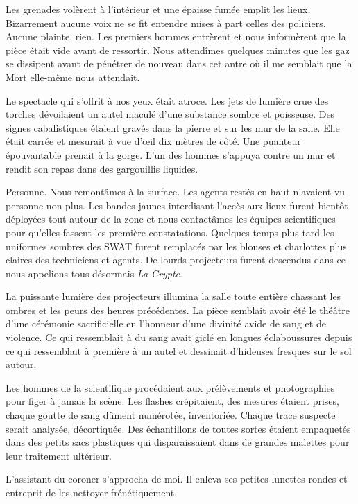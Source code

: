 Les grenades volèrent à l'intérieur et une épaisse fumée emplit les lieux. Bizarrement aucune voix ne se fit entendre 
mises à part celles des policiers. Aucune plainte, rien. Les premiers hommes entrèrent et nous informèrent que la pièce 
était vide avant de ressortir. Nous attendîmes quelques minutes que les gaz se dissipent avant de pénétrer de nouveau 
dans cet antre où il me semblait que la Mort elle-même nous attendait.

Le spectacle qui s'offrit à nos yeux était atroce. Les jets de lumière crue des torches dévoilaient un autel maculé 
d'une substance sombre et poisseuse. Des signes cabalistiques étaient gravés dans la pierre et sur les mur de la salle. 
Elle était carrée et mesurait à vue d'œil dix mètres de côté. Une puanteur épouvantable prenait à la gorge. L'un des 
hommes s'appuya contre un mur et rendit son repas dans des gargouillis liquides.

Personne. Nous remontâmes à la surface. Les agents restés en haut n'avaient vu personne non plus. Les bandes jaunes 
interdisant l'accès aux lieux furent bientôt déployées tout autour de la zone et nous contactâmes les équipes 
scientifiques pour qu'elles fassent les première constatations. Quelques temps plus tard les uniformes sombres des SWAT 
furent remplacés par les blouses et charlottes plus claires des techniciens et agents. De lourds projecteurs 
furent descendus dans ce nous appelions tous désormais \emph{La Crypte}.

La puissante lumière des projecteurs illumina la salle toute entière chassant les ombres et les peurs des heures 
précédentes. La pièce semblait avoir été le théâtre d'une cérémonie sacrificielle en l'honneur d'une divinité avide de 
sang et de violence. Ce qui ressemblait à du sang avait giclé en longues éclaboussures depuis ce qui ressemblait à 
première à un autel et dessinait d'hideuses fresques sur le sol autour.

Les hommes de la scientifique procédaient aux prélèvements et photographies pour figer à jamais la scène. Les flashes 
crépitaient, des mesures étaient prises, chaque goutte de sang dûment numérotée, inventoriée. Chaque trace suspecte serait 
analysée, décortiquée. Des échantillons de toutes sortes étaient empaquetés dans des petits sacs plastiques qui 
disparaissaient dans de grandes malettes pour leur traitement ultérieur.

L'assistant du coroner s'approcha de moi. Il enleva ses petites lunettes rondes et entreprit de les nettoyer 
frénétiquement.

